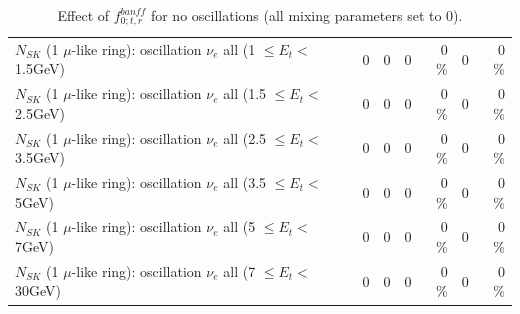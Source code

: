 \begin{table}
\begin{tabular}{| l | r | r | r  r | r  r |}
$N_{SK}$ (1 $\mu$-like ring): oscillation $\nu_{e}$ all (1 $\leq E_{t} <$ 1.5GeV) &               0 &               0 &               0 &        0 \%  &               0 &        0 \%  \\ 
$N_{SK}$ (1 $\mu$-like ring): oscillation $\nu_{e}$ all (1.5 $\leq E_{t} <$ 2.5GeV) &               0 &               0 &               0 &        0 \%  &               0 &        0 \%  \\ 
$N_{SK}$ (1 $\mu$-like ring): oscillation $\nu_{e}$ all (2.5 $\leq E_{t} <$ 3.5GeV) &               0 &               0 &               0 &        0 \%  &               0 &        0 \%  \\ 
$N_{SK}$ (1 $\mu$-like ring): oscillation $\nu_{e}$ all (3.5 $\leq E_{t} <$ 5GeV) &               0 &               0 &               0 &        0 \%  &               0 &        0 \%  \\ 
 $N_{SK}$ (1 $\mu$-like ring): oscillation $\nu_{e}$ all (5 $\leq E_{t} <$ 7GeV) &               0 &               0 &               0 &        0 \%  &               0 &        0 \%  \\ 
$N_{SK}$ (1 $\mu$-like ring): oscillation $\nu_{e}$ all (7 $\leq E_{t} <$ 30GeV) &               0 &               0 &               0 &        0 \%  &               0 &        0 \%  \\ 
\hline
\hline
\end{tabular}
\caption{ Effect of $f_{0; t, r}^{banff}$ for no oscillations (all mixing parameters set to 0). }
\label{tab:num_banff_00_1RmuT_3f_osc_t13:0}
\end{table}
\clearpage
